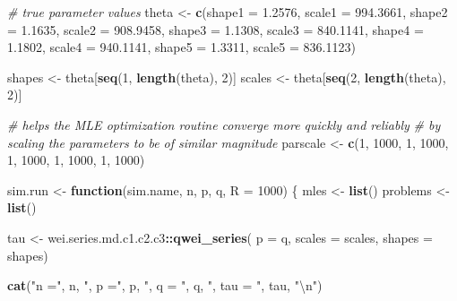 \documentclass[
]{article}
\newenvironment{Shaded}{\begin{snugshade}}{\end{snugshade}}
\newcommand{\CharTok}[1]{\textcolor[rgb]{0.31,0.60,0.02}{#1}}
\newcommand{\CommentTok}[1]{\textcolor[rgb]{0.56,0.35,0.01}{\textit{#1}}}
\newcommand{\ControlFlowTok}[1]{\textcolor[rgb]{0.13,0.29,0.53}{\textbf{#1}}}
\newcommand{\DataTypeTok}[1]{\textcolor[rgb]{0.13,0.29,0.53}{#1}}
\newcommand{\DecValTok}[1]{\textcolor[rgb]{0.00,0.00,0.81}{#1}}
\newcommand{\FloatTok}[1]{\textcolor[rgb]{0.00,0.00,0.81}{#1}}
\newcommand{\KeywordTok}[1]{\textcolor[rgb]{0.13,0.29,0.53}{\textbf{#1}}}
\newcommand{\NormalTok}[1]{#1}
\newcommand{\OperatorTok}[1]{\textcolor[rgb]{0.81,0.36,0.00}{\textbf{#1}}}
\newcommand{\StringTok}[1]{\textcolor[rgb]{0.31,0.60,0.02}{#1}}
\begin{document}
\begin{Shaded}
\begin{Highlighting}[]
\CommentTok{\# true parameter values}
\NormalTok{theta \textless{}{-}}\StringTok{ }\KeywordTok{c}\NormalTok{(}\DataTypeTok{shape1 =} \FloatTok{1.2576}\NormalTok{, }\DataTypeTok{scale1 =} \FloatTok{994.3661}\NormalTok{,}
           \DataTypeTok{shape2 =} \FloatTok{1.1635}\NormalTok{, }\DataTypeTok{scale2 =} \FloatTok{908.9458}\NormalTok{,}
           \DataTypeTok{shape3 =} \FloatTok{1.1308}\NormalTok{, }\DataTypeTok{scale3 =} \FloatTok{840.1141}\NormalTok{,}
           \DataTypeTok{shape4 =} \FloatTok{1.1802}\NormalTok{, }\DataTypeTok{scale4 =} \FloatTok{940.1141}\NormalTok{,}
           \DataTypeTok{shape5 =} \FloatTok{1.3311}\NormalTok{, }\DataTypeTok{scale5 =} \FloatTok{836.1123}\NormalTok{)}

\NormalTok{shapes \textless{}{-}}\StringTok{ }\NormalTok{theta[}\KeywordTok{seq}\NormalTok{(}\DecValTok{1}\NormalTok{, }\KeywordTok{length}\NormalTok{(theta), }\DecValTok{2}\NormalTok{)]}
\NormalTok{scales \textless{}{-}}\StringTok{ }\NormalTok{theta[}\KeywordTok{seq}\NormalTok{(}\DecValTok{2}\NormalTok{, }\KeywordTok{length}\NormalTok{(theta), }\DecValTok{2}\NormalTok{)]}

\CommentTok{\# helps the MLE optimization routine converge more quickly and reliably}
\CommentTok{\# by scaling the parameters to be of similar magnitude}
\NormalTok{parscale \textless{}{-}}\StringTok{ }\KeywordTok{c}\NormalTok{(}\DecValTok{1}\NormalTok{, }\DecValTok{1000}\NormalTok{, }\DecValTok{1}\NormalTok{, }\DecValTok{1000}\NormalTok{, }\DecValTok{1}\NormalTok{, }\DecValTok{1000}\NormalTok{, }\DecValTok{1}\NormalTok{, }\DecValTok{1000}\NormalTok{, }\DecValTok{1}\NormalTok{, }\DecValTok{1000}\NormalTok{)}

\NormalTok{sim.run \textless{}{-}}\StringTok{ }\ControlFlowTok{function}\NormalTok{(sim.name, n, p, q, }\DataTypeTok{R =} \DecValTok{1000}\NormalTok{) \{}
\NormalTok{    mles \textless{}{-}}\StringTok{ }\KeywordTok{list}\NormalTok{()}
\NormalTok{    problems \textless{}{-}}\StringTok{ }\KeywordTok{list}\NormalTok{()}

\NormalTok{    tau \textless{}{-}}\StringTok{ }\NormalTok{wei.series.md.c1.c2.c3}\OperatorTok{::}\KeywordTok{qwei\_series}\NormalTok{(}
        \DataTypeTok{p =}\NormalTok{ q, }\DataTypeTok{scales =}\NormalTok{ scales, }\DataTypeTok{shapes =}\NormalTok{ shapes)}

    \KeywordTok{cat}\NormalTok{(}\StringTok{"n ="}\NormalTok{, n, }\StringTok{", p ="}\NormalTok{, p, }\StringTok{", q = "}\NormalTok{, q, }\StringTok{", tau = "}\NormalTok{, tau, }\StringTok{"}\CharTok{\textbackslash{}n}\StringTok{"}\NormalTok{)}


\end{Highlighting}
\end{Shaded}
\end{document}
